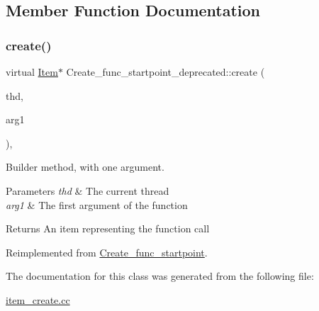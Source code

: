 \subsection{Member Function Documentation}
\mbox{\label{classCreate__func__startpoint__deprecated_a037938ac02aa1a8553c82c913b85f3c3}} 
\subsubsection{\texorpdfstring{create()}{create()}}
{\footnotesize\ttfamily virtual \mbox{\hyperlink{classItem}{Item}}$\ast$ Create\+\_\+func\+\_\+startpoint\+\_\+deprecated\+::create (\begin{DoxyParamCaption}\item[{T\+HD $\ast$}]{thd,  }\item[{\mbox{\hyperlink{classItem}{Item}} $\ast$}]{arg1 }\end{DoxyParamCaption})\hspace{0.3cm}{\ttfamily [inline]}, {\ttfamily [virtual]}}

Builder method, with one argument. 
\begin{DoxyParams}{Parameters}
{\em thd} & The current thread \\
\hline
{\em arg1} & The first argument of the function \\
\hline
\end{DoxyParams}
\begin{DoxyReturn}{Returns}
An item representing the function call 
\end{DoxyReturn}


Reimplemented from \mbox{\hyperlink{classCreate__func__startpoint_ae7588448bfe733247410bb191dedc5d6}{Create\+\_\+func\+\_\+startpoint}}.



The documentation for this class was generated from the following file\+:\begin{DoxyCompactItemize}
\item 
\mbox{\hyperlink{item__create_8cc}{item\+\_\+create.\+cc}}\end{DoxyCompactItemize}
